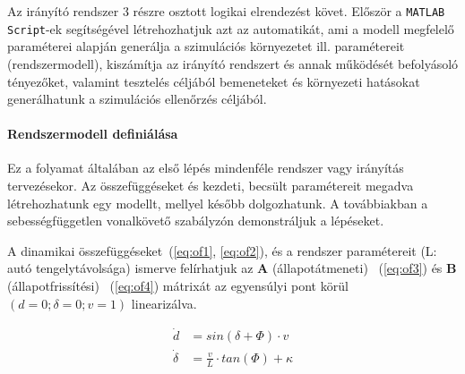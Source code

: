 Az irányító rendszer 3 részre osztott logikai elrendezést követ. Először a \verb!MATLAB Script!-ek segítségével létrehozhatjuk azt az automatikát, ami a modell megfelelő paraméterei alapján generálja a szimulációs környezetet ill. paramétereit (rendszermodell), kiszámítja az irányító rendszert és annak működését befolyásoló tényezőket, valamint tesztelés céljából bemeneteket és környezeti hatásokat generálhatunk a szimulációs ellenőrzés céljából.

\paragraph{Rendszermodell definiálása}

Ez a folyamat általában az első lépés mindenféle rendszer vagy irányítás tervezésekor. Az összefüggéseket és kezdeti, becsült paramétereit megadva létrehozhatunk egy modellt, mellyel később dolgozhatunk. A továbbiakban a sebességfüggetlen vonalkövető szabályzón demonstráljuk a lépéseket.

A dinamikai összefüggéseket~(\ref{eq:of1}, \ref{eq:of2}), és a rendszer paramétereit (L: autó tengelytávolsága) ismerve felírhatjuk az \textbf{A} (állapotátmeneti) ~(\ref{eq:of3}) és \textbf{B} (állapotfrissítési) ~(\ref{eq:of4}) mátrixát az egyensúlyi pont körül $(d = 0; \delta = 0; v = 1)$ linearizálva.

\begin{align} 
    \dot{d} &= sin(\delta + \Phi) \cdot v  \label{eq:of1} \\ 
    \dot{\delta} &= \frac{v}{L} \cdot tan(\Phi) + \kappa \label{eq:of2}
\end{align}

